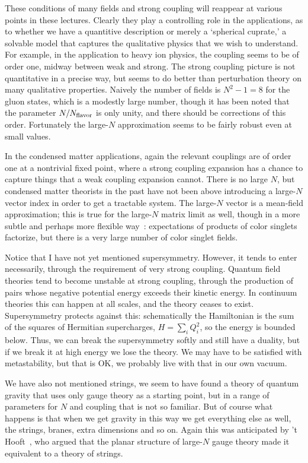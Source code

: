 \documentclass[12pt]{article}
\begin{document}
These conditions of many fields and strong coupling will reappear at various points in these lectures.  Clearly they play a controlling role in the applications, as to whether we have a quantitive description or merely a `spherical cuprate,' a solvable model that captures the qualitative physics that we wish to understand.  For example, in the application to heavy ion physics, the coupling seems to be of order one, midway between weak and strong.  The strong coupling picture is not quantitative in a precise way, but seems to do better than perturbation theory on many qualitative properties.  Naively the number of fields is $N^2 - 1 = 8$ for the gluon states, which is a modestly large number, though it has been noted that the parameter $N/N_{\rm flavor}$ is only unity, and there should be corrections of this order.  Fortunately the large-$N$ approximation seems to be fairly robust even at small values.  

In the condensed matter applications, again the relevant couplings are of order one at a nontrivial fixed point, where a strong coupling expansion has a chance to capture things that a weak coupling expansion cannot.  There is no large $N$, but condensed matter theorists in the past have not been above introducing a large-$N$ vector index in order to get a tractable system.  The large-$N$ vector is a mean-field approximation; this is true for the large-$N$ matrix limit as well, though in a more subtle and perhaps more flexible way~\cite{Witten:1979pi}: expectations of products of color singlets factorize, but there is a very large number of color singlet fields.

Notice that I have not yet mentioned supersymmetry.  However, it tends to enter necessarily, through the requirement of very strong coupling.  Quantum field theories tend to become unstable at strong coupling, through the production of pairs whose negative potential energy exceeds their kinetic energy.  In continuum theories this can happen at all scales, and the theory ceases to exist.  Supersymmetry protects against this: schematically the Hamiltonian is the sum of the squares of  Hermitian supercharges, $H = \sum_i Q_i^2$, so the energy is bounded below.  Thus, we can break the supersymmetry softly and still have a duality, but if we break it at high energy we lose the theory.  We may have to be satisfied with metastability, but that is OK, we probably live with that in our own vacuum.

We have also not mentioned strings, we seem to have found a theory of quantum gravity that uses only gauge theory as a starting point, but in a range of parameters for $N$ and coupling that is not so familiar.  But of course what happens is that when we get gravity in this way we get everything else as well, the strings, branes, extra dimensions and so on.  Again this was anticipated by 't Hooft~\cite{'tHooft:1973jz}, who argued that the planar structure of large-$N$ gauge theory made it equivalent to a theory of strings.
\end{document}
